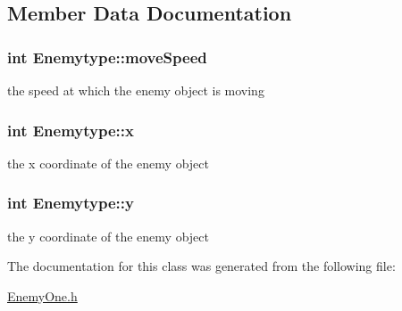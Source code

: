 \subsection{Member Data Documentation}
\hypertarget{classEnemytype_a7fbb15c1e006c25cc926b55cd3ea23dd}{
\subsubsection[{moveSpeed}]{\setlength{\rightskip}{0pt plus 5cm}int {\bf Enemytype::moveSpeed}}}
\label{classEnemytype_a7fbb15c1e006c25cc926b55cd3ea23dd}
the speed at which the enemy object is moving \hypertarget{classEnemytype_ac73360c104ab8e6f4cad79af69e904dd}{
\subsubsection[{x}]{\setlength{\rightskip}{0pt plus 5cm}int {\bf Enemytype::x}}}
\label{classEnemytype_ac73360c104ab8e6f4cad79af69e904dd}
the x coordinate of the enemy object \hypertarget{classEnemytype_a22ab8ba090798eb7fad364b0319f4d13}{
\subsubsection[{y}]{\setlength{\rightskip}{0pt plus 5cm}int {\bf Enemytype::y}}}
\label{classEnemytype_a22ab8ba090798eb7fad364b0319f4d13}
the y coordinate of the enemy object 

The documentation for this class was generated from the following file:\begin{DoxyCompactItemize}
\item 
\hyperlink{EnemyOne_8h}{EnemyOne.h}\end{DoxyCompactItemize}

